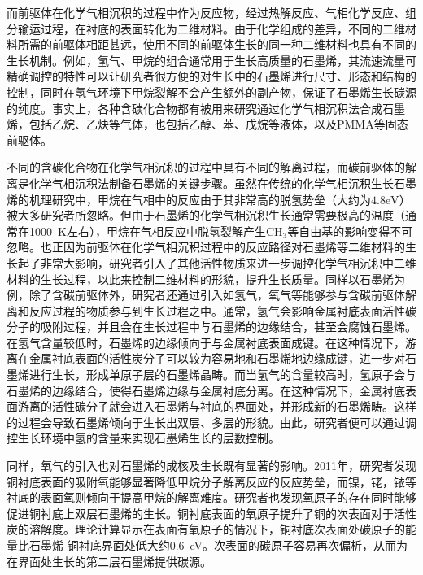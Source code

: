     而前驱体在化学气相沉积的过程中作为反应物，经过热解反应、气相化学反应、组分输运过程，在衬底的表面转化为二维材料。由于化学组成的差异，不同的二维材料所需的前驱体相距甚远，使用不同的前驱体生长的同一种二维材料也具有不同的生长机制。例如，氢气、甲烷的组合通常用于生长高质量的石墨烯，其流速流量可精确调控的特性可以让研究者很方便的对生长中的石墨烯进行尺寸、形态和结构的控制，同时在氢气环境下甲烷裂解不会产生额外的副产物，保证了石墨烯生长碳源的纯度。事实上，各种含碳化合物都有被用来研究通过化学气相沉积法合成石墨烯，包括乙烷、乙炔等气体，也包括乙醇、苯、戊烷等液体，以及PMMA等固态前驱体。

    不同的含碳化合物在化学气相沉积的过程中具有不同的解离过程，而碳前驱体的解离是化学气相沉积法制备石墨烯的关键步骤。虽然在传统的化学气相沉积生长石墨烯的机理研究中，甲烷在气相中的反应由于其非常高的脱氢势垒（大约为$4.8\si{\electronvolt}$）被大多研究者所忽略。但由于石墨烯的化学气相沉积生长通常需要极高的温度（通常在\SI{1000}{\kelvin}左右），甲烷在气相反应中脱氢裂解产生CH$_3$等自由基的影响变得不可忽略。也正因为前驱体在化学气相沉积过程中的反应路径对石墨烯等二维材料的生长起了非常大影响，研究者引入了其他活性物质来进一步调控化学气相沉积中二维材料的生长过程，以此来控制二维材料的形貌，提升生长质量。同样以石墨烯为例，除了含碳前驱体外，研究者还通过引入如氢气，氧气等能够参与含碳前驱体解离和反应过程的物质参与到生长过程之中。通常，氢气会影响金属衬底表面活性碳分子的吸附过程，并且会在生长过程中与石墨烯的边缘结合，甚至会腐蚀石墨烯。在氢气含量较低时，石墨烯的边缘倾向于与金属衬底表面成键。在这种情况下，游离在金属衬底表面的活性炭分子可以较为容易地和石墨烯地边缘成键，进一步对石墨烯进行生长，形成单原子层的石墨烯晶畴。而当氢气的含量较高时，氢原子会与石墨烯的边缘结合，使得石墨烯边缘与金属衬底分离。在这种情况下，金属衬底表面游离的活性碳分子就会进入石墨烯与衬底的界面处，并形成新的石墨烯畴。这样的过程会导致石墨烯倾向于生长出双层、多层的形貌。由此，研究者便可以通过调控生长环境中氢的含量来实现石墨烯生长的层数控制。

    同样，氧气的引入也对石墨烯的成核及生长既有显著的影响。2011年，研究者发现铜衬底表面的吸附氧能够显著降低甲烷分子解离反应的反应势垒，而镍，铑，铱等衬底的表面氧则倾向于提高甲烷的解离难度。研究者也发现氧原子的存在同时能够促进铜衬底上双层石墨烯的生长。铜衬底表面的氧原子提升了铜的次表面对于活性炭的溶解度。理论计算显示在表面有氧原子的情况下，铜衬底次表面处碳原子的能量比石墨烯-铜衬底界面处低大约\SI{0.6}{\electronvolt}。次表面的碳原子容易再次偏析，从而为在界面处生长的第二层石墨烯提供碳源。

